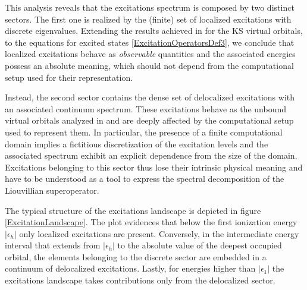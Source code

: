 \documentclass[reprint,aps,prb]{revtex4-1}
\newcommand{\dd}{{\rm d}}
\newcommand{\eps}{\epsilon}
\newcommand{\be}{\begin{equation}}
\newcommand{\ee}{\end{equation}}
\newcommand{\lb}{\label}
\newcommand{\op}[1]{\hat {#1}}
\newcommand{\sop}[1]{\op{\op {#1}}}
\newcommand{\commutator}[2]{\left[ {#1} , {#2} \right]}
\newcommand{\trace}[1]{\mathrm{tr}\left(#1\right)}
\newcommand{\dmnot}{\op{\rho}_0}
\begin{document}
This analysis reveals that the excitations spectrum is composed by two distinct sectors. The first one is realized by the (finite) set of localized excitations with discrete eigenvalues. Extending 
the results achieved in \cite{boffi2016} for the KS virtual orbitals, to the equations for excited states \eqref{ExcitationOperatorsDef3}, we conclude that localized excitations behave as 
\emph{observable} quantities and the associated energies possess an absolute meaning, which should not depend from the computational setup used for their representation. 

Instead, the second sector contains the dense set of delocalized excitations with an associated continuum spectrum. These excitations behave as the unbound virtual orbitals analyzed in \cite{boffi2016} 
and are deeply affected by the computational setup used to represent them. In particular, the presence of a finite computational domain implies a fictitious discretization of the excitation levels and 
the associated spectrum exhibit an explicit dependence from the size of the domain. Excitations belonging to this sector thus lose their intrinsic physical meaning and have to be understood as a tool to 
express the spectral decomposition of the Liouvillian superoperator. 

The typical structure of the excitations landscape is depicted in figure \ref{ExcitationLandscape}. The plot evidences that below the first ionization energy $|\eps_h|$ only localized excitations are 
present. Conversely, in the intermediate energy interval that extends from $|\eps_h|$ to the absolute value of the deepest occupied orbital, the elements belonging to the discrete sector are embedded 
in a continuum of delocalized excitations. Lastly, for energies higher than $|\eps_1|$ the excitations landscape takes contributions only from the delocalized sector. 

\end{document}
